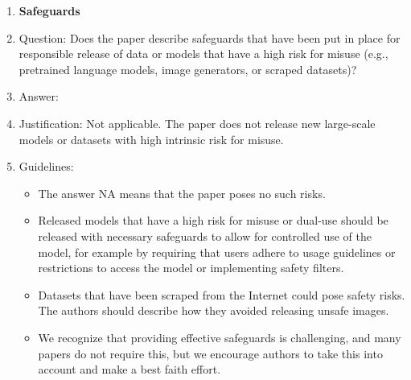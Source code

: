 \documentclass{article}
\theoremstyle{plain}
\theoremstyle{definition}
\theoremstyle{remark}
\begin{document}
\begin{enumerate}
\item {\bf Safeguards}
    \item[] Question: Does the paper describe safeguards that have been put in place for responsible release of data or models that have a high risk for misuse (e.g., pretrained language models, image generators, or scraped datasets)?
    \item[] Answer: \answerNA{} %
    \item[] Justification: Not applicable. The paper does not release new large-scale models or datasets with high intrinsic risk for misuse.
    \item[] Guidelines:
    \begin{itemize}
        \item The answer NA means that the paper poses no such risks.
        \item Released models that have a high risk for misuse or dual-use should be released with necessary safeguards to allow for controlled use of the model, for example by requiring that users adhere to usage guidelines or restrictions to access the model or implementing safety filters. 
        \item Datasets that have been scraped from the Internet could pose safety risks. The authors should describe how they avoided releasing unsafe images.
        \item We recognize that providing effective safeguards is challenging, and many papers do not require this, but we encourage authors to take this into account and make a best faith effort.
    \end{itemize}


\end{enumerate}
\end{document}
